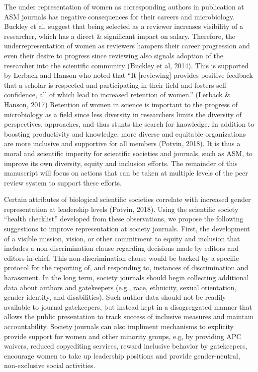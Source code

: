 \documentclass[11pt,]{article}
\begin{document}
The under representation of women as corresponding authors in
publication at ASM journals has negative consequences for their careers
and microbiology. Buckley et al, suggest that being selected as a
reviewer increases visibility of a researcher, which has a direct \&
significant impact on salary. Therefore, the underrepresentation of
women as reviewers hampers their career progression and even their
desire to progress since reviewing also signals adoption of the
researcher into the scientific community (Buckley et al, 2014). This is
supported by Lerback and Hanson who noted that ``It {[}reviewing{]}
provides positive feedback that a scholar is respected and participating
in their field and fosters self-confidence, all of which lead to
increased retention of women.'' (Lerback \& Hanson, 2017) Retention of
women in science is important to the progress of microbiology as a field
since less diversity in researchers limits the diversity of
perspectives, approaches, and thus stunts the search for knowledge. In
addition to boosting productivity and knowledge, more diverse and
equitable organizations are more inclusive and supportive for all
members (Potvin, 2018). It is thus a moral and scientific imperity for
scientific societies and journals, such as ASM, to improve its own
diversity, equity and inclusion efforts. The remainder of this
manuscript will focus on actions that can be taken at multiple levels of
the peer review system to support these efforts.

Certain attributes of biological scientific societies correlate with
increased gender representation at leadership levels (Potvin, 2018).
Using the scientific society ``health checklist'' developed from these
observations, we propose the following suggestions to improve
representation at society journals. First, the development of a visible
mission, vision, or other commitment to equity and inclusion that
includes a non-discrimination clause regarding decisions made by editors
and editors-in-chief. This non-discrimination clause would be backed by
a specific protocol for the reporting of, and responding to, instances
of discrimination and harassment. In the long term, society journals
should begin collecting additional data about authors and gatekeepers
(e.g., race, ethnicity, sexual orientation, gender identity, and
disabilities). Such author data should not be readily available to
journal gatekeepers, but instead kept in a disagreggated manner that
allows the public presentation to track success of inclusive measures
and maintain accountability. Society journals can also impliment
mechanisms to explicity provide support for women and other minority
groups, e.g, by providing APC waivers, reduced copyediting services,
reward inclusive behavior by gatekeepers, encourage women to take up
leadership positions and provide gender-neutral, non-exclusive social
activities.
\end{document}
